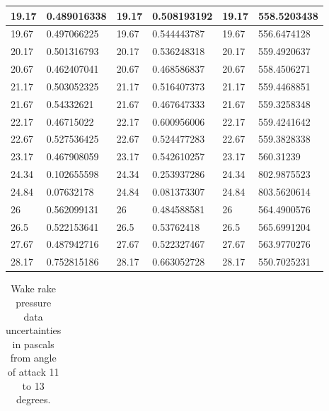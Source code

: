 \documentclass[11pt, letterpaper]{article}
\begin{document}
\begin{appendices}
\begin{table}[!ht]
\begin{tabular}{|l|l|l|l|l|l|}
        19.17 & 0.489016338 & 19.17 & 0.508193192 & 19.17 & 558.5203438 \\ \hline
        19.67 & 0.497066225 & 19.67 & 0.544443787 & 19.67 & 556.6474128 \\ \hline
        20.17 & 0.501316793 & 20.17 & 0.536248318 & 20.17 & 559.4920637 \\ \hline
        20.67 & 0.462407041 & 20.67 & 0.468586837 & 20.67 & 558.4506271 \\ \hline
        21.17 & 0.503052325 & 21.17 & 0.516407373 & 21.17 & 559.4468851 \\ \hline
        21.67 & 0.54332621 & 21.67 & 0.467647333 & 21.67 & 559.3258348 \\ \hline
        22.17 & 0.46715022 & 22.17 & 0.600956006 & 22.17 & 559.4241642 \\ \hline
        22.67 & 0.527536425 & 22.67 & 0.524477283 & 22.67 & 559.3828338 \\ \hline
        23.17 & 0.467908059 & 23.17 & 0.542610257 & 23.17 & 560.31239 \\ \hline
        24.34 & 0.102655598 & 24.34 & 0.253937286 & 24.34 & 802.9875523 \\ \hline
        24.84 & 0.07632178 & 24.84 & 0.081373307 & 24.84 & 803.5620614 \\ \hline
        26 & 0.562099131 & 26 & 0.484588581 & 26 & 564.4900576 \\ \hline
        26.5 & 0.522153641 & 26.5 & 0.53762418 & 26.5 & 565.6991204 \\ \hline
        27.67 & 0.487942716 & 27.67 & 0.522327467 & 27.67 & 563.9770276 \\ \hline
        28.17 & 0.752815186 & 28.17 & 0.663052728 & 28.17 & 550.7025231 \\ \hline
    \end{tabular}
\end{table}

\begin{table}[!ht]
    \centering
    \caption{Wake rake pressure data uncertainties in pascals from angle of attack 11 to 13 degrees.}
    \begin{tabular}{|l|l|l|l|l|l|}
    

\end{tabular}
\end{table}
\end{appendices}
\end{document}
